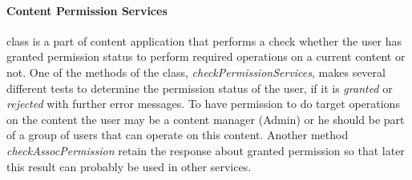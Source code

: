 \paragraph{Content Permission Services} class is a part of content application that performs a check whether the user has granted permission status to perform required operations on a current content or not. One of the methods of the class, \textit{checkPermissionServices}, makes several different tests to determine the permission status of the user, if it is \textit{granted} or \textit{rejected} with further error messages. To have permission to do target operations on the content the user may be a content manager (Admin) or he should be part of a group of users that can operate on this content. Another method \textit{checkAssocPermission} retain the response about granted permission so that later this result can probably be used in other services.  